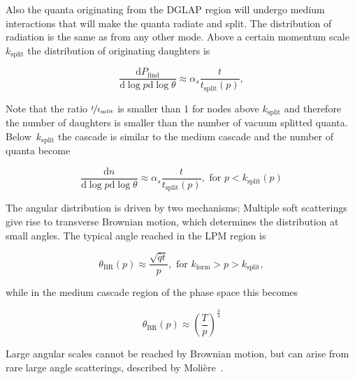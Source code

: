 Also the quanta originating from the DGLAP region will undergo medium interactions that will make the quanta radiate and split. The distribution of radiation is the same as from any other mode. Above a certain momentum scale $k_\mathrm{split}$ the distribution of originating daughters is 


\begin{equation}
\frac{\mathrm d P_\mathrm{find}}{\mathrm d \log p \mathrm{d} \log \theta} \approx \alpha_s \frac{t}{t_\mathrm{split}\left(p\right)},
\end{equation} 

Note that the ratio $\nicefrac{t}{t_\mathrm{split}}$ is smaller than 1 for nodes above $k_\mathrm{split}$ and therefore the number of daughters is smaller than the number of vacuum splitted quanta. Below $k_\mathrm{split}$ the cascade is similar to the medium cascade and the number of quanta become

\begin{equation}
\frac{\mathrm{d}n}{\mathrm{d}\log p \mathrm{d} \log \theta} \approx \alpha_s \frac{t}{t_\mathrm{split}\left(p\right)}, \text{ for } p < k_\mathrm{split}\left(p\right)
\end{equation}


The angular distribution is driven by two mechanisms; Multiple soft scatterings give rise to transverse Brownian motion, which determines the distribution at small angles. The typical angle reached in the LPM region is 

\begin{equation}
\theta_\mathrm{BR}\left(p\right) \approx \frac{\sqrt{\hat q t}}{p}, \text{ for } k_\mathrm{form} > p > k_\mathrm{split},
\end{equation}

while in the medium cascade region of the phase space this becomes

\begin{equation}
\theta_\mathrm{BR}\left(p\right) \approx \left(\frac{T}{p}\right)^{\frac{3}{4}}
\end{equation}

Large angular scales cannot be reached by Brownian motion, but can arise from rare large angle scatterings, described by Molière~\cite{}.



